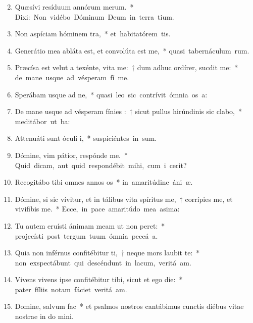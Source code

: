 \begin{flushleft}
\begin{enumerate}[leftmargin=*]
\setcounter{enumi}{1}


\item Quæsívi resíduum annórum merum.~* \mbox{Dixi: Non vidébo Dóminum Deum in terra tium.}
\item Non aspíciam hóminem tra,~* \mbox{et habitatórem tis.}
\item Generátio mea abláta est, et convolúta est  me,~* \mbox{quasi tabernáculum rum.}
\item Præcísa est velut a texénte, vita me:~† dum adhuc ordírer, sucdit me:~* \mbox{de mane usque ad vésperam fí me.}
\item Sperábam usque ad ne,~* \mbox{quasi leo sic contrívit ómnia os a:}
\item De mane usque ad vésperam fínies :~† sicut pullus hirúndinis sic clabo,~* \mbox{meditábor ut ba:}
\item Attenuáti sunt óculi i,~* \mbox{suspiciéntes in sum.}
\item Dómine, vim pátior, respónde  me.~* \mbox{Quid dicam, aut quid respondébit mihi, cum i cerit?}
\item Recogitábo tibi omnes annos os~* \mbox{in amaritúdine áni æ.}
\item Dómine, si sic vívitur, et in tálibus vita spíritus me,~† corrípies me, et vivifibis me.~* \mbox{Ecce, in pace amaritúdo mea asima:}
\item Tu autem eruísti ánimam meam ut non peret:~* \mbox{projecísti post tergum tuum ómnia peccá a.}
\item Quia non inférnus confitébitur ti,~† neque mors laubit te:~* \mbox{non exspectábunt qui descéndunt in lacum, veritá am.}
\item Vivens vivens ipse confitébitur tibi, sicut et ego die:~* \mbox{pater fíliis notam fáciet veritá am.}
\item Domine, salvum  fac~* et psalmos nostros cantábimus cunctis diébus vitae nostrae in do mini.

\end{enumerate}
\end{flushleft}

